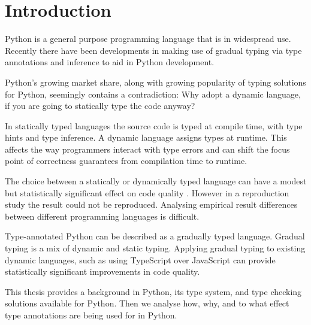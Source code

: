 \chapter{Introduction\label{intro}}


Python is a general purpose programming language that is in widespread use. Recently there have been developments in making use of gradual typing via type annotations and inference to aid in Python development.

Python's growing market share, along with growing popularity of typing solutions for Python, seemingly contains a contradiction: Why adopt a dynamic language, if you are going to statically type the code anyway?

In statically typed languages the source code is typed at compile time, with type hints and type inference. A dynamic language assigns types at runtime. This affects the way programmers interact with type errors and can shift the focus point of correctness guarantees from compilation time to  runtime.

The choice between a statically or dynamically typed language can have a modest but statistically significant effect on code quality \cite{ray_codequality_2014}.
However in a reproduction study \cite{codequality_reproudction_2019} the result could not be reproduced. Analysing empirical result differences between different programming languages is difficult.

Type-annotated Python can be described as a gradually typed language. Gradual typing is a mix of dynamic and static typing. Applying gradual typing to existing dynamic languages, such as using TypeScript over JavaScript can provide statistically significant improvements in code quality. %

This thesis provides a background in Python, its type system, and type checking solutions available for Python. Then we analyse how, why, and to what effect type annotations are being used for in Python.





